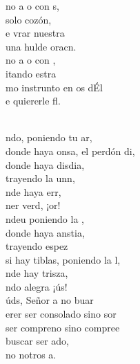 \documentclass[12pt]{article}
\begin{document}
\begin{multicols*}{2}
\begin{cancion}%
	\begin{chorus}%
	no a o con s,\\
	 solo cozón,\\
	e vrar nuestra   \\
	 una hulde oracn.\\
	no a o con , \\
	itando estra \\
	mo instrunto en os dÉl\\
	e quiererle fl.\\
	\end{chorus}%
	\jump\\
	ndo, poniendo tu ar,\\
	donde haya onsa, el perdón di,\\
	donde haya disdia, \\
	trayendo la unn,\\
	nde haya err, \\
	ner verd, ¡or! \\
	ndeu poniendo la ,\\
	donde haya anstia,\\
	trayendo espez\\
	si hay tiblas, poniendo la l,\\
	nde hay trisza, \\
	ndo alegra ¡ús!\\
	úds, Señor a no buar\\
	erer ser consolado sino sor\\
	ser compreno sino compree\\
	 buscar ser ado,\\
	no notros a.\\
\end{cancion}%


\end{multicols*}
\end{document}
